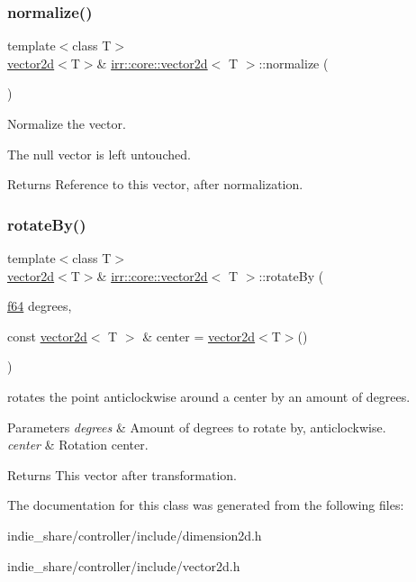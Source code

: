 \subsubsection{\texorpdfstring{normalize()}{normalize()}}
{\footnotesize\ttfamily template$<$class T$>$ \\
\hyperlink{classirr_1_1core_1_1vector2d}{vector2d}$<$T$>$\& \hyperlink{classirr_1_1core_1_1vector2d}{irr\+::core\+::vector2d}$<$ T $>$\+::normalize (\begin{DoxyParamCaption}{ }\end{DoxyParamCaption})\hspace{0.3cm}{\ttfamily [inline]}}



Normalize the vector. 

The null vector is left untouched. \begin{DoxyReturn}{Returns}
Reference to this vector, after normalization. 
\end{DoxyReturn}
\mbox{\label{classirr_1_1core_1_1vector2d_ac9c77997f6594d79d5daa5f6bf690ed2}} 
\subsubsection{\texorpdfstring{rotate\+By()}{rotateBy()}}
{\footnotesize\ttfamily template$<$class T$>$ \\
\hyperlink{classirr_1_1core_1_1vector2d}{vector2d}$<$T$>$\& \hyperlink{classirr_1_1core_1_1vector2d}{irr\+::core\+::vector2d}$<$ T $>$\+::rotate\+By (\begin{DoxyParamCaption}\item[{\hyperlink{namespaceirr_a1325b02603ad449f92c68fc640af9b28}{f64}}]{degrees,  }\item[{const \hyperlink{classirr_1_1core_1_1vector2d}{vector2d}$<$ T $>$ \&}]{center = {\ttfamily \hyperlink{classirr_1_1core_1_1vector2d}{vector2d}$<$T$>$()} }\end{DoxyParamCaption})\hspace{0.3cm}{\ttfamily [inline]}}



rotates the point anticlockwise around a center by an amount of degrees. 


\begin{DoxyParams}{Parameters}
{\em degrees} & Amount of degrees to rotate by, anticlockwise. \\
\hline
{\em center} & Rotation center. \\
\hline
\end{DoxyParams}
\begin{DoxyReturn}{Returns}
This vector after transformation. 
\end{DoxyReturn}


The documentation for this class was generated from the following files\+:\begin{DoxyCompactItemize}
\item 
indie\+\_\+share/controller/include/dimension2d.\+h\item 
indie\+\_\+share/controller/include/vector2d.\+h\end{DoxyCompactItemize}
